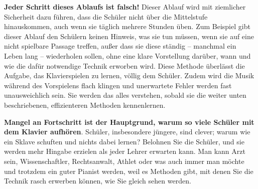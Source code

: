 \textbf{Jeder Schritt dieses Ablaufs ist falsch!}
Dieser Ablauf wird mit ziemlicher Sicherheit dazu führen, dass die Schüler nicht über die Mittelstufe hinauskommen, auch wenn sie täglich mehrere Stunden üben.
Zum Beispiel gibt dieser Ablauf den Schülern keinen Hinweis, was sie tun müssen, wenn sie auf eine nicht spielbare Passage treffen, außer dass sie diese ständig -- manchmal ein Leben lang -- wiederholen sollen, ohne eine klare Vorstellung darüber, wann und wie die dafür notwendige Technik erworben wird.
Diese Methode überlässt die Aufgabe, das Klavierspielen zu lernen, völlig dem Schüler.
Zudem wird die Musik während des Vorspielens flach klingen und unerwartete Fehler werden fast unausweichlich sein.
Sie werden das alles verstehen, sobald sie die weiter unten beschriebenen, effizienteren Methoden kennenlernen.

\textbf{Mangel an Fortschritt ist der Hauptgrund, warum so viele Schüler mit dem Klavier aufhören}.
Schüler, insbesondere jüngere, sind clever; warum wie ein Sklave schuften und nichts dabei lernen?
Belohnen Sie die Schüler, und sie werden mehr Hingabe erzielen als jeder Lehrer erwarten kann.
Man kann Arzt sein, Wissenschaftler, Rechtsanwalt, Athlet oder was auch immer man möchte und trotzdem ein guter Pianist werden, weil es Methoden gibt, mit denen Sie die Technik rasch erwerben können, wie Sie gleich sehen werden.

